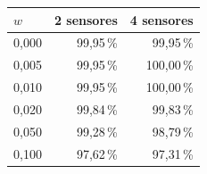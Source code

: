 \begin{tabular}{lrr}
\toprule
$w$ & 2 sensores & 4 sensores \\
\midrule
0,000 & 99,95\,\% & 99,95\,\% \\
0,005 & 99,95\,\% & 100,00\,\% \\
0,010 & 99,95\,\% & 100,00\,\% \\
0,020 & 99,84\,\% & 99,83\,\% \\
0,050 & 99,28\,\% & 98,79\,\% \\
0,100 & 97,62\,\% & 97,31\,\% \\
\bottomrule
\end{tabular}

